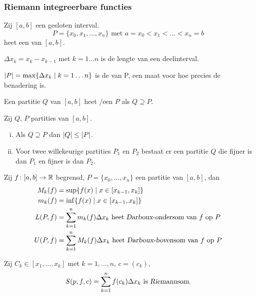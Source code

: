 \documentclass{2wa40summary}
\begin{document}
		\subsubsection{Riemann integreerbare functies}
			\begin{define}
				Zij $ [a,b] $ een gesloten interval. 
				\[ 
					P = \{ x_0,x_1,\ldots,x_n \} \text{ met } a=x_0 < x_1 < \ldots < x_n = b
				 \]
				 heet een  van $ [a,b] $.
			\end{define}
			\begin{nota}
				$ \Delta x_k = x_k - x_{k-1} $ met $ k=1\ldots n $ is de lengte van een deelinterval.
				
				$ {\left|P\right|} = \max \{ \Delta x_k \mid k=1\ldots n \} $ is de  van P, een maat voor hoe precies de benadering is.
			\end{nota}
			\begin{define}
				Een partitie $Q$ van $[a,b]$ heet /een  $P$ als $Q \supseteq P$.
			\end{define}
			\begin{lemma}
				Zij $Q$, $P$ partities van $[a,b]$.
				\begin{enumerate}[(i)]
					\item Als $Q \supseteq P$ dan $ {\left|Q\right|} \le {\left|P\right|} $.
					\item Voor twee willekeurige partities $P_1$ en $P_2$ bestaat er een partitie $Q$ die fijner is dan $P_1$ en fijner is dan $P_2$.
				\end{enumerate}
			\end{lemma}
			\begin{define}
				Zij $ f\colon [a,b] \to \mathbb{R} $ begrensd, $ P = \{ x_0,\ldots,x_n \} $ een partitie van $[a,b]$, dan
				\[
				\begin{split}
					M_k (f) &= \sup \{ f(x) \mid x \in [x_{k-1},x_k] \} \\
					m_k (f) &= \inf \{ f(x) \mid x \in [x_{k-1},x_k] \} \\
					L(P,f) &= \sum_{k=1}^{n} m_k (f) \Delta x_k \text{ heet  \indx{Darboux-ondersom} van $f$ op $P$}\\
					U(P,f) &= \sum_{k=1}^{n} M_k (f) \Delta x_k \text{ heet  \indx{Darboux-bovensom} van $f$ op $P$}
				 \end{split}
				 \]
				 
				 Zij $C_k \in [x_1,\ldots,x_k]$ met $k=1,\ldots,n$, $c=(c_k)$,
				 \[ 
					 S(p,f,c) = \sum_{k=1}^{n} f(c_k) \Delta x_k \text{ is \indx{Riemannsom}.}
				  \]
			\end{define}
\end{document}

